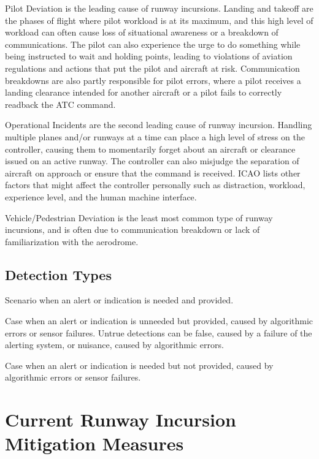 Pilot Deviation is the leading cause of runway incursions. Landing and takeoff are the phases of flight where pilot workload is at its maximum, and this high level of workload can often cause loss of situational awareness or a breakdown of communications. The pilot can also experience the urge to do something while being instructed to wait and holding points, leading to violations of aviation regulations and actions that put the pilot and aircraft at risk. Communication breakdowns are also partly responsible for pilot errors, where a pilot receives a landing clearance intended for another aircraft or a pilot fails to correctly readback the ATC command.

Operational Incidents are the second leading cause of runway incursion. Handling multiple planes and/or runways at a time can place a high level of stress on the controller, causing them to momentarily forget about an aircraft or clearance issued on an active runway. The controller can also misjudge the separation of aircraft on approach or ensure that the command is received. ICAO lists other factors that might affect the controller personally such as distraction, workload, experience level, and the human machine interface.

Vehicle/Pedestrian Deviation is the least most common type of runway incursions, and is often due to communication breakdown or lack of familiarization with the aerodrome.

\subsection{Detection Types}

\begin{description}
    [font=\normalfont,leftmargin=1.9in,style=multiline]
    \item[True Detection]
        Scenario when an alert or indication is needed and provided.
    \item[Untrue Detection]
        Case when an alert or indication is unneeded but provided, caused by algorithmic errors or sensor failures. Untrue detections can be false, caused by a failure of the alerting system, or nuisance, caused by algorithmic errors.
    \item[Missed Detection]
        Case when an alert or indication is needed but not provided, caused by algorithmic errors or sensor failures.
\end{description}

\section{Current Runway Incursion Mitigation Measures}

